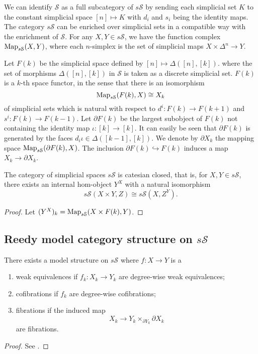 \begin{refsection}
We can identify $\mathcal S$ as a full subcategory of $s\mathcal S$ by sending each simplicial set $K$ to the constant simplicial space $[n]\mapsto K$ with $d_i$ and $s_i$ being the identity maps. The category $s\mathcal S$ can be enriched over simplicial sets in a compatible way with the enrichment of $\mathcal S$. For any $X,Y\in s\mathcal S$, we have the function complex $\operatorname{\mathrm{Map}}_{s\mathcal S}(X,Y)$, where each $n$-simplex is the set of simplicial maps $X\times\Delta^n\to Y$.

Let $F(k)$ be the simplicial space defined by $[n]\mapsto \Delta([n],[k])$. where the set of morphisms $\Delta([n],[k])$ in $\mathcal S$ is taken as a discrete simplicial set. $F(k)$ is a $k$-th space functor, in the sense that there is an isomorphism
$$\operatorname{\mathrm{Map}}_{s\mathcal S}(F(k),X)\cong X_k$$
of simplicial sets which is natural with respect to $d^i:F(k)\to F(k+1)$ and $s^i:F(k)\to F(k-1)$.
Let $\partial F(k)$ be the largest subobject of $F(k)$ not containing the identity map $\iota:[k]\to[k]$. It can easily be seen that $\partial F(k)$ is generated by the faces $d_i\iota\in\Delta([k-1],[k])$. We denote by $\partial X_k$ the mapping space $\operatorname{\mathrm{Map}}_{s\mathcal S}(\partial F(k),X)$. The inclusion $\partial F(k)\hookrightarrow F(k)$ induces a map $X_k\to\partial X_k$.

\begin{prop}
  The category of simplicial spaces $s\mathcal{S}$ is catesian closed, that is, for $X,Y\in s\mathcal S$, there exists an internal hom-object $Y^X$ with a natural isomorphism
$$s\mathcal S(X\times Y,Z)\cong s\mathcal S(X,Z^Y).$$
\end{prop}
\begin{proof}
Let $(Y^X)_k=\operatorname{\mathrm{Map}}_{s\mathcal S}(X\times F(k),Y)$.
\end{proof}

\subsection{Reedy model category structure on $s\mathcal S$}
\begin{thm}
There exists a model structure on $s\mathcal S$ where $f:X\to Y$ is a
\begin{enumerate}
\item weak equivalences if $f_k:X_k\to Y_k$ are degree-wise weak equivalences;
\item cofibrations if $f_k$ are degree-wise cofibrations;
\item fibrations if the induced map
\begin{equation} \label{Reedyfib}
X_k\to Y_k\times_{\partial Y_k}\partial X_k
\end{equation}
are fibrations.
\end{enumerate}
\end{thm}
\begin{proof}
See \cite[IV.3.2]{gj}.
\end{proof}


\end{refsection}
